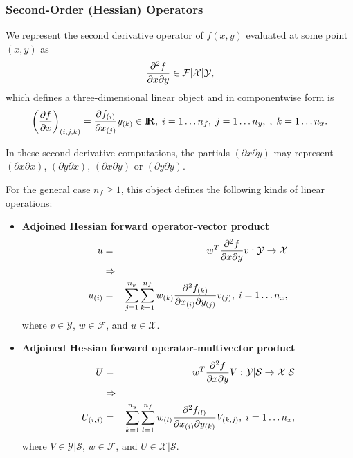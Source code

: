 \documentclass[pdf,ps2pdf,11pt]{SANDreport}
\begin{document}
\subsubsection{Second-Order (Hessian) Operators}

We represent the second derivative operator of $f(x,y)$ evaluated at
some point $(x,y)$ as
%
\begin{equation}
\displaystyle{\frac{\partial^2 f}{\partial x \partial y}}\in\mathcal{F}|\mathcal{X}|\mathcal{Y},
\end{equation}
%
which defines a three-dimensional linear object and in componentwise form is
%
\begin{equation}
\left(\displaystyle{\frac{\partial f}{\partial x}}\right)_{(i,j,k)} = \displaystyle{\frac{\partial f_{(i)}}{\partial x_{(j)}}}{y_{(k)}} \in\mbox{\textbf{I}}\hspace{-0.6ex}\mbox{\textbf{R}},
  \; i = 1 \ldots n_f, \; j = 1 \ldots n_y, \; , \; k = 1 \ldots n_x.
\end{equation}

In these second derivative computations, the partials $(\partial x {}\partial
y)$ may represent $(\partial x {}\partial x)$, $(\partial y {}\partial x)$,
$(\partial x {}\partial y)$ or $(\partial y {}\partial y)$.

For the general case $n_f\ge{}1$, this object defines the following
kinds of linear operations:
%
\begin{itemize}
%
{}\item \textbf{Adjoined Hessian forward operator-vector product}
%
\begin{eqnarray*}
u & = & w^T \displaystyle{\frac{\partial^2 f}{\partial x \partial y}} v : \mathcal{Y} \rightarrow \mathcal{X} \\
& \Rightarrow & \\
u_{(i)} & = & \sum_{j=1}^{n_y} \sum_{k=1}^{n_f} w_{(k)}\displaystyle{\frac{\partial^2 f_{(k)}}{\partial x_{(i)} \partial y_{(j)}}} v_{(j)},
   \; i = 1 \ldots n_x,
\end{eqnarray*}
%
where $v\in\mathcal{Y}$, $w\in\mathcal{F}$, and $u\in\mathcal{X}$.
%
{}\item \textbf{Adjoined Hessian forward operator-multivector product}
%
\begin{eqnarray*}
U & = & w^T \displaystyle{\frac{\partial^2 f}{\partial x \partial y}} V : \mathcal{Y}|\mathcal{S} \rightarrow \mathcal{X}|\mathcal{S} \\
& \Rightarrow & \\
U_{(i,j)} & = & \sum_{k=1}^{n_y} \sum_{l=1}^{n_f} w_{(l)}\displaystyle{\frac{\partial^2 f_{(l)}}{\partial x_{(i)} \partial y_{(k)}}} V_{(k,j)},
   \; i = 1 \ldots n_x,
\end{eqnarray*}
%
where $V\in\mathcal{Y}|\mathcal{S}$, $w\in\mathcal{F}$, and $U\in\mathcal{X}|\mathcal{S}$.
%
\end{itemize}
\end{document}
